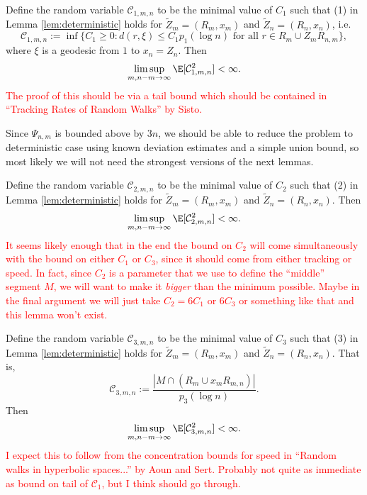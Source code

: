 \begin{lem} \label{lem:boundC1}
    Define the random variable $\mathcal{C}_{1,m,n}$ to be the
    minimal value of $C_1$
    such that (1) in Lemma \ref{lem:deterministic} holds 
    for $\tilde{Z}_m = (R_m,x_m)$
    and $\tilde{Z}_n = (R_n,x_n)$,
    i.e.
    \[
       \mathcal{C}_{1,m,n} := 
       \inf \{ C_1 \ge 0 : 
       d(r,\xi) \le C_1 p_1(\log n) 
       \mbox{ for all } 
       r \in R_m \cup Z_m R_{n,m} \},
    \]
    where $\xi$ is a geodesic
    from $1$ to $x_n = Z_n$.
    Then
    \[
       \limsup_{m,n-m \to \infty} \E[ \mathcal{C}_{1,m,n}^2 ] < \infty.
    \]
    \textcolor{red}{The proof of this should be via a tail bound
    which should be contained in ``Tracking Rates of Random Walks'' by Sisto.}
\end{lem}
 Since $\Psi_{n,m}$ is bounded above by $3n$, we should be able to reduce the problem to deterministic case using  known deviation estimates and a simple union bound, so most likely we will not need the strongest versions of the next lemmas.
\begin{lem} \label{lem:boundC2}
    Define the random variable $\mathcal{C}_{2,m,n}$ to be the
    minimal value of $C_2$
    such that (2) in Lemma \ref{lem:deterministic} holds 
    for $\tilde{Z}_m = (R_m,x_m)$
    and $\tilde{Z}_n = (R_n,x_n)$.
    Then
    \[
       \limsup_{m,n-m \to \infty} \E[ \mathcal{C}_{2,m,n}^2 ] < \infty.
    \]
    \textcolor{red}{It seems likely enough that in the end the bound on $C_2$ will come simultaneously with the bound on either $C_1$ or $C_3$, since it
    should come from either tracking or speed. In fact, since $C_2$ is a parameter that we use to define the ``middle'' segment $M$, we will want to make it \emph{bigger} than the minimum possible. Maybe in the final argument we will just take 
    $C_2 = 6 C_1$ or $6 C_3$ or something like that and this lemma won't exist.}
\end{lem}

\begin{lem} \label{lem:boundC3}
    Define the random variable $\mathcal{C}_{3,m,n}$ to be the
    minimal value of $C_3$
    such that (3) in Lemma \ref{lem:deterministic} holds 
    for $\tilde{Z}_m = (R_m,x_m)$
    and $\tilde{Z}_n = (R_n,x_n)$.
    That is,
    \[
       \mathcal{C}_{3,m,n} :=
       \frac{|M \cap (R_m \cup x_m R_{m,n})|}{p_3(\log n)}.
    \]
    Then
    \[
       \limsup_{m,n-m \to \infty} \E[ \mathcal{C}_{3,m,n}^2 ] < \infty.
    \]
    \textcolor{red}{I expect this to follow from the concentration bounds for speed in ``Random walks in hyperbolic spaces...'' by Aoun and Sert. Probably not quite as immediate as bound on tail of $\mathcal{C}_1$,
    but I think should go through.}
\end{lem}

